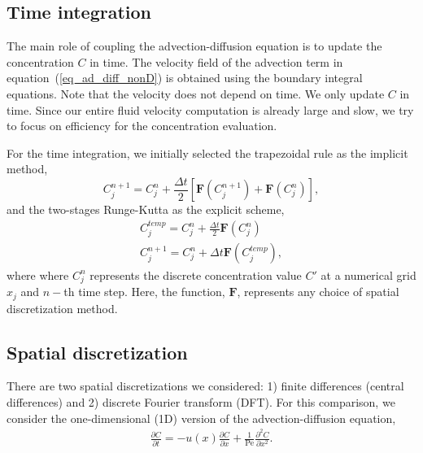 \subsection{Time integration}
\label{sec:AD_times}
The main role of coupling the advection-diffusion equation is to update the concentration $C$ in time. The velocity field of the advection term in equation~(\ref{eq_ad_diff_nonD}) is obtained using the boundary integral equations. Note that the velocity does not depend on time. 
We only update $C$ in time. Since our entire fluid velocity computation is already large and slow, we try to focus on efficiency for the concentration evaluation.
\par
For the time integration, 
we initially selected the trapezoidal rule as the implicit method,
\begin{equation}
	C_{j}^{n+1}
	 = C_{j}^{n}+ \frac{\Delta t}{2 } \left[  {\bm F} \left(C_j^{n+1} \right)+ {\bm F}\left(C_j^{n} \right) \right],
	 \label{eq_trap}
\end{equation}
and the two-stages Runge-Kutta as the explicit scheme,
\begin{align}
	C_{j}^{temp} = C_j^{n} + \frac{\Delta t}{2} {\bm F} \left( C_j^{n} \right)
	\label{eq_RK_step1} \\ 
	C_j^{n+1} = C_j^{n} + \Delta t {\bm F} \left( C_j^{temp} \right),
	\label{eq_RK_step2}
\end{align}
where where $C_j^n$  represents the discrete concentration value $C'$ at a numerical grid $x_j$ and $n-$th time step.
Here, the function, $\bm{F}$, represents any choice of spatial discretization method. 

\subsection{Spatial discretization}
\label{subsec:AD_numerics_space}
There are two spatial discretizations we considered: 1) finite differences (central differences) and 2) discrete Fourier transform (DFT). 
For this comparison, we consider the one-dimensional (1D) version of the advection-diffusion equation,
\begin{align}
	\frac{\partial C}{\partial t} = 
	- u(x) \frac{\partial C}{\partial x} 
	+ \frac{1}{\text{Pe}} \frac{\partial^2 C}{\partial x^2}.
	\label{eq_space_C}
\end{align}

